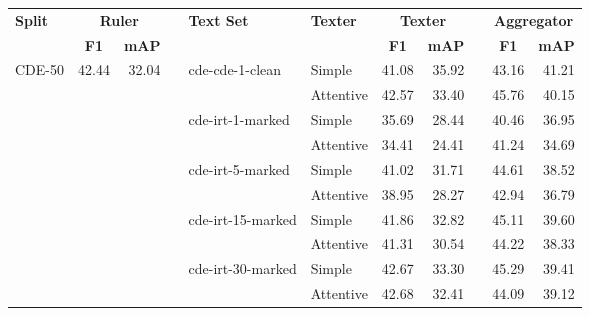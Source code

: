 \begin{tabular}{ l r r c l l r r c r r }
    \toprule

    \multicolumn{1}{l}{\textbf{Split}} &
    \multicolumn{2}{c}{\textbf{Ruler}} & \phantom &
    \multicolumn{1}{l}{\textbf{Text Set}} &
    \multicolumn{1}{l}{\textbf{Texter}} &
    \multicolumn{2}{c}{\textbf{Texter}} & \phantom &
    \multicolumn{2}{c}{\textbf{Aggregator}} \\

    \cmidrule{2-3}
    \cmidrule{7-8}
    \cmidrule{10-11}


    &
    \multicolumn{1}{c}{\textbf{F1}} &
    \multicolumn{1}{c}{\textbf{mAP}} &&
    &
    &
    \multicolumn{1}{c}{\textbf{F1}} &
    \multicolumn{1}{c}{\textbf{mAP}} &&
    \multicolumn{1}{c}{\textbf{F1}} &
    \multicolumn{1}{c}{\textbf{mAP}} \\

    \midrule

    \multirow{10}{*}{CDE-50} & \multirow{10}{*}{42.44} & \multirow{10}{*}{32.04} && \multirow{2}{*}{cde-cde-1-clean}   & Simple    & 41.08 & 35.92 && 43.16 & 41.21 \\
                             &                         &                         &&                                    & Attentive & 42.57 & 33.40 && 45.76 & 40.15 \\ \addlinespace
                             &                         &                         && \multirow{2}{*}{cde-irt-1-marked}  & Simple    & 35.69 & 28.44 && 40.46 & 36.95 \\
                             &                         &                         &&                                    & Attentive & 34.41 & 24.41 && 41.24 & 34.69 \\ \addlinespace
                             &                         &                         && \multirow{2}{*}{cde-irt-5-marked}  & Simple    & 41.02 & 31.71 && 44.61 & 38.52 \\
                             &                         &                         &&                                    & Attentive & 38.95 & 28.27 && 42.94 & 36.79 \\ \addlinespace
                             &                         &                         && \multirow{2}{*}{cde-irt-15-marked} & Simple    & 41.86 & 32.82 && 45.11 & 39.60 \\
                             &                         &                         &&                                    & Attentive & 41.31 & 30.54 && 44.22 & 38.33 \\ \addlinespace
                             &                         &                         && \multirow{2}{*}{cde-irt-30-marked} & Simple    & 42.67 & 33.30 && 45.29 & 39.41 \\
                             &                         &                         &&                                    & Attentive & 42.68 & 32.41 && 44.09 & 39.12 \\
    

\end{tabular}
